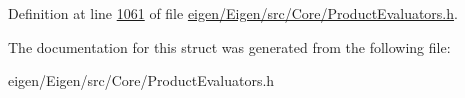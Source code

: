 Definition at line \hyperlink{eigen_2_eigen_2src_2_core_2_product_evaluators_8h_source_l01061}{1061} of file \hyperlink{eigen_2_eigen_2src_2_core_2_product_evaluators_8h_source}{eigen/\+Eigen/src/\+Core/\+Product\+Evaluators.\+h}.



The documentation for this struct was generated from the following file\+:\begin{DoxyCompactItemize}
\item 
eigen/\+Eigen/src/\+Core/\+Product\+Evaluators.\+h\end{DoxyCompactItemize}
